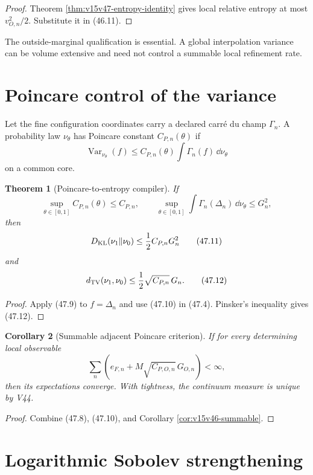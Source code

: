 \documentclass[11pt]{article}
\newtheorem{theorem}{Theorem}[section]
\newtheorem{corollary}[theorem]{Corollary}
\theoremstyle{remark}
\begin{document}
\begin{proof}
Theorem \ref{thm:v15v47-entropy-identity} gives local relative
entropy at most \(v_{O,n}^2/2\).  Substitute it in (46.11).
\end{proof}

The outside-marginal qualification is essential.  A global
interpolation variance can be volume extensive and need not control
a summable local refinement rate.

\section{Poincare control of the variance}

Let the fine configuration coordinates carry a declared carré du
champ \(\Gamma_n\).  A probability law \(\nu_\theta\) has Poincare
constant \(C_{P,n}(\theta)\) if
\[
 \operatorname{Var}_{\nu_\theta}(f)
 \leq C_{P,n}(\theta)
 \int\Gamma_n(f)\,\dd\nu_\theta                         \tag{47.9}
\]
on a common core.

\begin{theorem}[Poincare-to-entropy compiler]
\label{thm:v15v47-poincare}
If
\[
 \sup_{\theta\in[0,1]}C_{P,n}(\theta)\leq C_{P,n},
 \qquad
 \sup_{\theta\in[0,1]}
 \int\Gamma_n(\Delta_n)\,\dd\nu_\theta\leq G_n^2,        \tag{47.10}
\]
then
\[
 D_{\rm KL}(\nu_1\Vert\nu_0)
 \leq\frac12C_{P,n}G_n^2                                \tag{47.11}
\]
and
\[
 d_{\rm TV}(\nu_1,\nu_0)
 \leq\frac12\sqrt{C_{P,n}}\,G_n.                        \tag{47.12}
\]
\end{theorem}

\begin{proof}
Apply (47.9) to \(f=\Delta_n\) and use (47.10) in (47.4).
Pinsker's inequality gives (47.12).
\end{proof}

\begin{corollary}[Summable adjacent Poincare criterion]
\label{cor:v15v47-summable}
If for every determining local observable
\[
 \sum_n\left(e_{F,n}
 +M\sqrt{C_{P,O,n}}\,G_{O,n}\right)<\infty,             \tag{47.13}
\]
then its expectations converge.  With tightness, the continuum
measure is unique by V44.
\end{corollary}

\begin{proof}
Combine (47.8), (47.10), and Corollary
\ref{cor:v15v46-summable}.
\end{proof}

\section{Logarithmic Sobolev strengthening}
\end{document}
